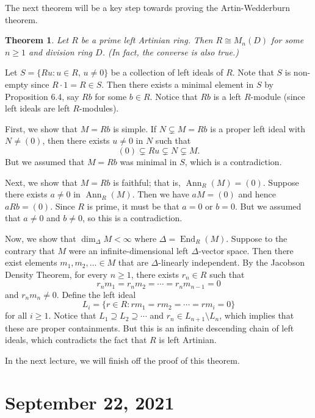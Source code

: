 \documentclass[10pt]{article}
\makeatletter
\numberwithin{equation}{section}
\DeclareMathOperator{\End}{End}
\DeclareMathOperator{\Ann}{Ann}
\theoremstyle{newstyle}
\newtheorem{thm}{Theorem}[section]
\newenvironment{pf}[1][\proofname]{\par
  \pushQED{\qed}%
  \normalfont \topsep0\p@\relax
  \trivlist
  \item[\hskip\labelsep\scshape
  #1\@addpunct{.}]\ignorespaces
}{%
  \popQED\endtrivlist\@endpefalse
}
\makeatother
\begin{document}
The next theorem will be a key step towards proving the Artin-Wedderburn theorem.

\begin{thm}
Let $R$ be a prime left Artinian ring. Then $R \cong M_n(D)$ for some $n \geq 1$ and division ring 
$D$. (In fact, the converse is also true.)
\end{thm}
\begin{pf}
Let $S = \{Ru : u \in R,\, u \neq 0\}$ be a collection of left ideals of $R$. Note that $S$ 
is non-empty since $R \cdot 1 = R \in S$. Then there exists a minimal element in $S$ by Proposition 
6.4, say $Rb$ for some $b \in R$. Notice that $Rb$ is a left $R$-module (since 
left ideals are left $R$-modules). 

First, we show that $M = Rb$ is simple. If $N \subsetneq M = Rb$ is a proper left ideal with 
$N \neq (0)$, then there exists $u \neq 0$ in $N$ such that 
\[ (0) \subsetneq Ru \subsetneq N \subsetneq M. \]
But we assumed that $M = Rb$ was minimal in $S$, which is a contradiction. 

Next, we show that $M = Rb$ is faithful; that is, $\Ann_R(M) = (0)$. Suppose there exists 
$a \neq 0$ in $\Ann_R(M)$. Then we have $aM = (0)$ and hence $aRb = (0)$. Since $R$ is prime,
it must be that $a = 0$ or $b = 0$. But we assumed that $a \neq 0$ and $b \neq 0$, so this is 
a contradiction. 

Now, we show that $\dim_\Delta M < \infty$ where $\Delta = \End_R(M)$. Suppose to the contrary 
that $M$ were an infinite-dimensional left $\Delta$-vector space. Then there exist elements 
$m_1, m_2, \dots \in M$ that are $\Delta$-linearly independent. By the Jacobson Density Theorem, 
for every $n \geq 1$, there exists $r_n \in R$ such that 
\[ r_nm_1 = r_nm_2 = \cdots = r_nm_{n-1} = 0 \]
and $r_nm_n \neq 0$. Define the left ideal 
\[ L_i = \{r \in R : rm_1 = rm_2 = \cdots = rm_i = 0\} \]
for all $i \geq 1$. Notice that $L_1 \supseteq L_2 \supseteq \cdots$ and $r_n \in L_{n+1} \setminus L_n$,
which implies that these are proper containments. But this is an infinite descending chain of 
left ideals, which contradicts the fact that $R$ is left Artinian. 

In the next lecture, we will finish off the proof of this theorem.
\end{pf}

\section{September 22, 2021}
\end{document}
